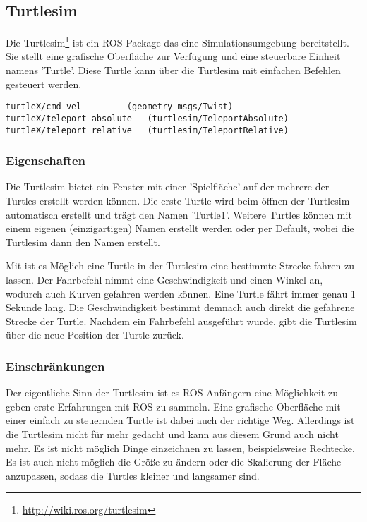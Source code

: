 \subsection*{Turtlesim}
Die Turtlesim\footnote{\url{http://wiki.ros.org/turtlesim}} ist ein ROS-Package das eine Simulationsumgebung bereitstellt. Sie stellt eine grafische Oberfläche zur Verfügung und eine steuerbare Einheit namens 'Turtle'. Diese Turtle kann über die Turtlesim mit einfachen Befehlen gesteuert werden.

\begin{lstlisting}[style=ros]
turtleX/cmd_vel			(geometry_msgs/Twist)
turtleX/teleport_absolute	(turtlesim/TeleportAbsolute)
turtleX/teleport_relative	(turtlesim/TeleportRelative)
\end{lstlisting}

\subsubsection*{Eigenschaften}
Die Turtlesim bietet ein Fenster mit einer 'Spielfläche' auf der mehrere der Turtles erstellt werden können. Die erste Turtle wird beim öffnen der Turtlesim automatisch erstellt und trägt den Namen 'Turtle1'. Weitere Turtles können mit einem eigenen (einzigartigen) Namen erstellt werden oder per Default, wobei die Turtlesim dann den Namen erstellt.

Mit  ist es Möglich eine Turtle in der Turtlesim eine bestimmte Strecke fahren zu lassen. Der Fahrbefehl nimmt eine Geschwindigkeit und einen Winkel an, wodurch auch Kurven gefahren werden können. Eine Turtle fährt immer genau 1 Sekunde lang. Die Geschwindigkeit bestimmt demnach auch direkt die gefahrene Strecke der Turtle. Nachdem ein Fahrbefehl ausgeführt wurde, gibt die Turtlesim über  die neue Position der Turtle zurück.

\subsubsection*{Einschränkungen}
Der eigentliche Sinn der Turtlesim ist es ROS-Anfängern eine Möglichkeit zu geben erste Erfahrungen mit ROS zu sammeln. Eine grafische Oberfläche mit einer einfach zu steuernden Turtle ist dabei auch der richtige Weg. Allerdings ist die Turtlesim nicht für mehr gedacht und kann aus diesem Grund auch nicht mehr. Es ist nicht möglich Dinge einzeichnen zu lassen, beispielsweise Rechtecke. Es ist auch nicht möglich die Größe zu ändern oder die Skalierung der Fläche anzupassen, sodass die Turtles kleiner und langsamer sind.

